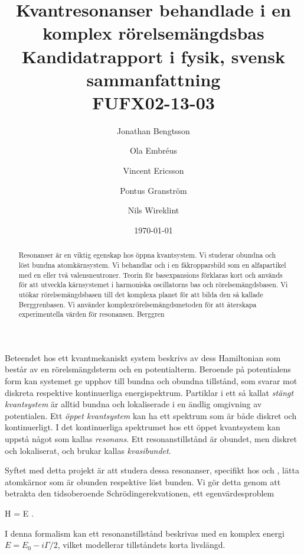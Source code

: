 \documentclass[12pt,a4paper]{article}
\begin{document}
  


\title{Kvantresonanser behandlade i en\\ komplex rörelsemängdsbas \\ 
\Large Kandidatrapport i fysik, svensk sammanfattning\\
FUFX02-13-03}
\author{Jonathan Bengtsson \and Ola Embréus \and Vincent Ericsson \and Pontus Granström \and Nils Wireklint}
\date{\today}
\maketitle
\newpage

\begin{abstract}
Resonanser är en viktig egenskap hos öppna kvantsystem. 
Vi studerar obundna och löst bundna atomkärnsystem.
Vi behandlar  och  i en fåkropparsbild som en alfapartikel med en eller två valensneutroner.
Teorin för basexpansions förklaras kort och används för att utveckla kärnsystemet i harmoniska oscillatorns bas och rörelsemängdsbasen.
Vi utökar rörelsemängdsbasen till det komplexa planet för att bilda den så kallade Berggrenbasen. 
Vi använder komplexrörelsemängdsmetoden för att återskapa experimentella värden för  resonansen.
Berggren

\end{abstract}




\newpage

Beteendet hos ett kvantmekaniskt system beskrivs av dess Hamiltonian som består av en rörelsmängdsterm och en potentialterm.
Beroende på potentialens form kan systemet ge upphov till bundna och obundna tillstånd, som svarar mot diskreta respektive kontinuerliga energispektrum.
Partiklar i ett så kallat \emph{stängt kvantsystem} är alltid bundna och lokaliserade i en ändlig omgivning av potentialen. 
Ett \emph{öppet kvantsystem} kan ha ett spektrum som är både diskret och kontinuerligt.
I det kontinuerliga spektrumet hos ett öppet kvantsystem kan uppstå något som kallas \emph{resonans}.
Ett resonanstillstånd är obundet, men diskret och lokaliserat, och brukar kallas \emph{kvasibundet}.

Syftet med detta projekt är att studera dessa resonanser, specifikt hos  och , lätta atomkärnor som är obunden respektive löst bunden.
Vi gör detta genom att betrakta den tidsoberoende Schrödingerekvationen, ett egenvärdesproblem
\begin{eq*}
  H \ket\psi = E \ket\psi.
\end{eq*}
I denna formalism kan ett resonanstillstånd beskrivas med en komplex energi $E = E_0 - i\Gamma/2$, vilket modellerar tillståndets korta livslängd.
\end{document}
